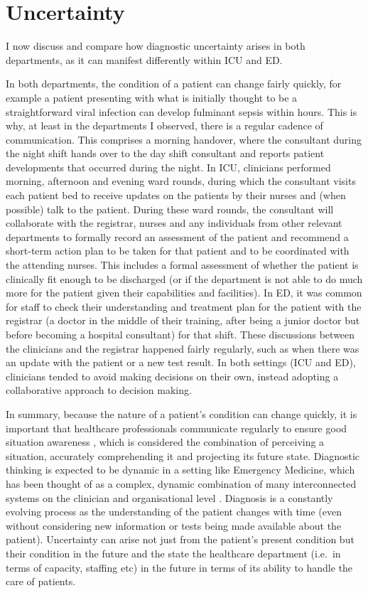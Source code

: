 \documentclass[a4paper, nobind]{templates/ociamthesis}
\begin{document}
\section*{Uncertainty}\label{uncertainty}

I now discuss and compare how diagnostic uncertainty arises in both departments, as it can manifest differently within ICU and ED.

\hfill\break
In both departments, the condition of a patient can change fairly quickly, for example a patient presenting with what is initially thought to be a straightforward viral infection can develop fulminant sepsis within hours. This is why, at least in the departments I observed, there is a regular cadence of communication. This comprises a morning handover, where the consultant during the night shift hands over to the day shift consultant and reports patient developments that occurred during the night. In ICU, clinicians performed morning, afternoon and evening ward rounds, during which the consultant visits each patient bed to receive updates on the patients by their nurses and (when possible) talk to the patient. During these ward rounds, the consultant will collaborate with the registrar, nurses and any individuals from other relevant departments to formally record an assessment of the patient and recommend a short-term action plan to be taken for that patient and to be coordinated with the attending nurses. This includes a formal assessment of whether the patient is clinically fit enough to be discharged (or if the department is not able to do much more for the patient given their capabilities and facilities). In ED, it was common for staff to check their understanding and treatment plan for the patient with the registrar (a doctor in the middle of their training, after being a junior doctor but before becoming a hospital consultant) for that shift. These discussions between the clinicians and the registrar happened fairly regularly, such as when there was an update with the patient or a new test result. In both settings (ICU and ED), clinicians tended to avoid making decisions on their own, instead adopting a collaborative approach to decision making.

\hfill\break
In summary, because the nature of a patient's condition can change quickly, it is important that healthcare professionals communicate regularly to ensure good situation awareness \autocite{endsley_toward_1995}, which is considered the combination of perceiving a situation, accurately comprehending it and projecting its future state. Diagnostic thinking is expected to be dynamic in a setting like Emergency Medicine, which has been thought of as a complex, dynamic combination of many interconnected systems on the clinician and organisational level \autocite{widmer_complex_2018}. Diagnosis is a constantly evolving process as the understanding of the patient changes with time (even without considering new information or tests being made available about the patient). Uncertainty can arise not just from the patient's present condition but their condition in the future and the state the healthcare department (i.e.~in terms of capacity, staffing etc) in the future in terms of its ability to handle the care of patients.
\end{document}

